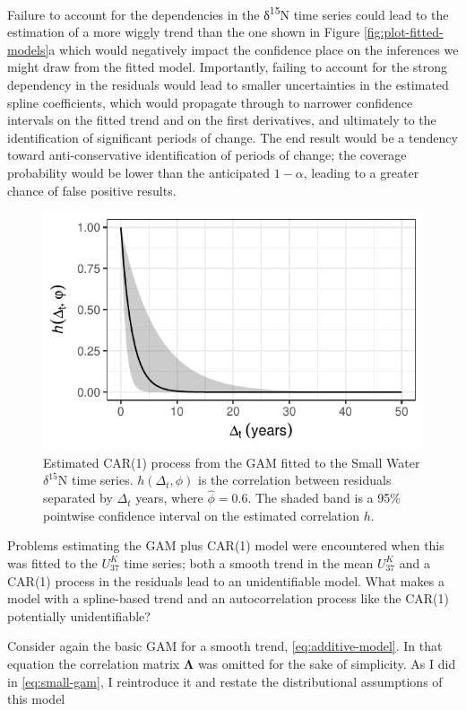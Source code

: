 \documentclass[12pt,]{article}
\newcommand{\uk}{\ensuremath{\mathit{U}^{\mathit{K}}_{\mathup{37}}}}
\begin{document}
Failure to account for the dependencies in the δ\textsuperscript{15}N
time series could lead to the estimation of a more wiggly trend than the
one shown in Figure \ref{fig:plot-fitted-models}a which would negatively
impact the confidence place on the inferences we might draw from the
fitted model. Importantly, failing to account for the strong dependency
in the residuals would lead to smaller uncertainties in the estimated
spline coefficients, which would propagate through to narrower
confidence intervals on the fitted trend and on the first derivatives,
and ultimately to the identification of significant periods of change.
The end result would be a tendency toward anti-conservative
identification of periods of change; the coverage probability would be
lower than the anticipated \(1 - \alpha\), leading to a greater chance
of false positive results.

\begin{figure}

{\centering \includegraphics[width=0.5\linewidth]{manuscript_files/figure-latex/car1-plot-1} 

}

\caption{Estimated CAR(1) process from the GAM fitted to the Small Water $\delta^{15}\text{N}$ time series. $h(\Delta_t, \phi)$ is the correlation between residuals separated by $\Delta_t$ years, where $\hat{\phi} = \text{0.6}$. The shaded band is a 95\% pointwise confidence interval on the estimated correlation $h$.}\label{fig:car1-plot}
\end{figure}

Problems estimating the GAM plus CAR(1) model were encountered when this
was fitted to the \uk{} time series; both a smooth trend in the mean
\uk{} and a CAR(1) process in the residuals lead to an unidentifiable
model. What makes a model with a spline-based trend and an
autocorrelation process like the CAR(1) potentially unidentifiable?

Consider again the basic GAM for a smooth trend,
\eqref{eq:additive-model}. In that equation the correlation matrix
\(\boldsymbol{\Lambda}\) was omitted for the sake of simplicity. As I
did in \eqref{eq:small-gam}, I reintroduce it and restate the
distributional assumptions of this model
\end{document}
